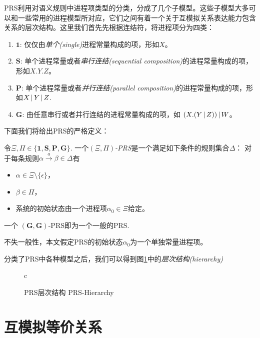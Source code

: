 PRS利用对语义规则中进程项类型的分类，分成了几个子模型。这些子模型大多可以和一些常用的进程模型所对应，它们之间有着一个关于互模拟关系表达能力包含关系的层次结构。这里我们首先先根据连结符，将进程项分为四类：
\begin{enumerate}
    \item $\mathbf{1}$: 仅仅由\emph{单个(single)}进程常量构成的项，形如$X$。
    \item $\mathbf{S}$: 单个进程常量或者\emph{串行连结(sequential composition)}的进程常量构成的项，形如$X.Y.Z$。
    \item $\mathbf{P}$: 单个进程常量或者\emph{并行连结(parallel composition)}的进程常量构成的项，形如$X\,|\, Y\,|\, Z$.
    \item $\mathbf{G}$: 由任意串行或者并行连结的进程常量构成的项，如 $(X.(Y\,|\, Z))\,|\, W$。
\end{enumerate}
下面我们将给出PRS的严格定义：
\begin{defn}\label{def:prs}
令$\Xi,\Pi\in\{\mathbf{1},\mathbf{S},\mathbf{P},\mathbf{G}\}$.
一个\emph{$(\Xi,\Pi)$-PRS}是一个满足如下条件的规则集合$\Delta$：
对于每条规则$\alpha \stackrel{a}{\longrightarrow} \beta\in \Delta$有
\begin{itemize}
	\item $\alpha\in\Xi\setminus \{\epsilon\}$，
	\item $\beta\in\Pi$，
	\item 系统的初始状态由一个进程项$\alpha_0\in\Xi$给定。
\end{itemize}
一个 $(\mathbf{G},\mathbf{G})$-PRS即为一个一般的PRS.
\end{defn}
不失一般性，本文假定PRS的初始状态$\alpha_0$为一个单独常量进程项。

分类了PRS中各种模型之后，我们可以得到图\ref{fig:prs}中的\emph{层次结构(hierarchy)}
\begin{figure}
\begin{center}
\begin{tabular}{c}
\end{tabular}
\end{center}
\caption{\textsf{PRS}层次结构 PRS-Hierarchy}
\label{fig:prs}
\end{figure}

\section{互模拟等价关系}
\label{sec:bis}

